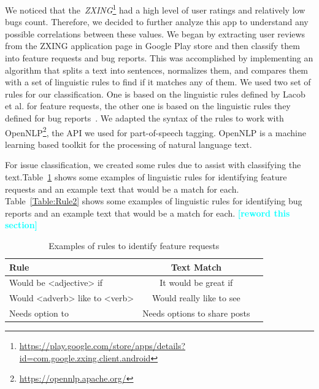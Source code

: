 \documentclass{sig-alternate}
\newcommand{\todo}[1]{\textcolor{cyan}{\textbf{[#1]}}}
\begin{document}
We noticed that the~\emph{ZXING}\footnote{\url{https://play.google.com/store/apps/details?id=com.google.zxing.client.android}} had a high level of user ratings and relatively low bugs count. Therefore, we decided to further analyze this app to understand any possible correlations between these values. We began by extracting user reviews from the ZXING application page in Google Play store and then classify them into feature requests and bug reports. This was accomplished by implementing an algorithm that splits a text into sentences, normalizes them, and compares them with a set of linguistic rules to find if it matches any of them. We used two set of rules for our classification. One is based on the linguistic rules defined by Lacob et al.\cite{Iacob:2013:RAM:2487085.2487094} for feature requests, the other one is based on the linguistic rules they defined for bug reports~\cite{10.1007/978-3-319-05452-0_4}. We adapted the syntax of the rules to work with OpenNLP\footnote{\url{https://opennlp.apache.org/}}, the API we used for part-of-speech tagging. OpenNLP is a machine learning based toolkit for the processing of natural language text.

For issue classification, we created some rules due to assist with classifying the text.Table~\ref{Table:Rule1} shows some examples of linguistic rules for identifying feature requests and an example text that would be a match for each. Table~\ref{Table:Rule2} shows some examples of linguistic rules for identifying bug reports and an example text that would be a match for each. \todo{reword this section}

\begin{table}[h]
\begin{center}
\caption{Examples of rules to identify feature requests}
\label{Table:Rule1}
  \begin{tabular}{ | l | c | c |  } \hline

     \bfseries Rule  & \bfseries Text Match \\ \hline
 
  
	Would be <adjective> if & It would be great if \\ \hline
	Would <adverb> like to <verb> & Would really like to see \\ \hline
	Needs option to & Needs options to share posts \\ \hline
	
  \end{tabular}
  \end{center}
\end{table}
\end{document}
